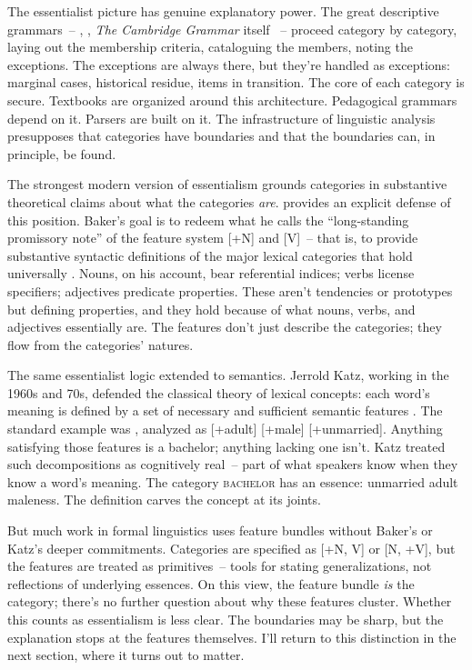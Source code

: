 The essentialist picture has genuine explanatory power. The great descriptive grammars~-- \textcite{jespersen1924}, \textcite{quirk1985}, \textit{The Cambridge Grammar} itself \citep[ch.~1]{huddleston2002}~-- proceed category by category, laying out the membership criteria, cataloguing the members, noting the exceptions. The exceptions are always there, but they're handled as exceptions: marginal cases, historical residue, items in transition. The core of each category is secure. Textbooks are organized around this architecture. Pedagogical grammars depend on it. Parsers are built on it. The infrastructure of linguistic analysis presupposes that categories have boundaries and that the boundaries can, in principle, be found.

The strongest modern version of essentialism grounds categories in substantive theoretical claims about what the categories \emph{are}. \textcite{baker2003} provides an explicit defense of this position. Baker's goal is to redeem what he calls the \enquote{long-standing promissory note} of the feature system [+N] and [V]~-- that is, to provide substantive syntactic definitions of the major lexical categories that hold universally \citep[17]{baker2003}. Nouns, on his account, bear referential indices; verbs license specifiers; adjectives predicate properties. These aren't tendencies or prototypes but defining properties, and they hold because of what nouns, verbs, and adjectives essentially are. The features don't just describe the categories; they flow from the categories' natures.

The same essentialist logic extended to semantics. Jerrold Katz, working in the 1960s and 70s, defended the classical theory of lexical concepts: each word's meaning is defined by a set of necessary and sufficient semantic features \citep{katz1972}. The standard example was , analyzed as [+adult] [+male] [+unmarried]. Anything satisfying those features is a bachelor; anything lacking one isn't. Katz treated such decompositions as cognitively real~-- part of what speakers know when they know a word's meaning. The category \textsc{bachelor} has an essence: unmarried adult maleness. The definition carves the concept at its joints.

But much work in formal linguistics uses feature bundles without Baker's or Katz's deeper commitments. Categories are specified as [+N, V] or [N, +V], but the features are treated as primitives~-- tools for stating generalizations, not reflections of underlying essences. On this view, the feature bundle \emph{is} the category; there's no further question about why these features cluster. Whether this counts as essentialism is less clear. The boundaries may be sharp, but the explanation stops at the features themselves. I'll return to this distinction in the next section, where it turns out to matter.

